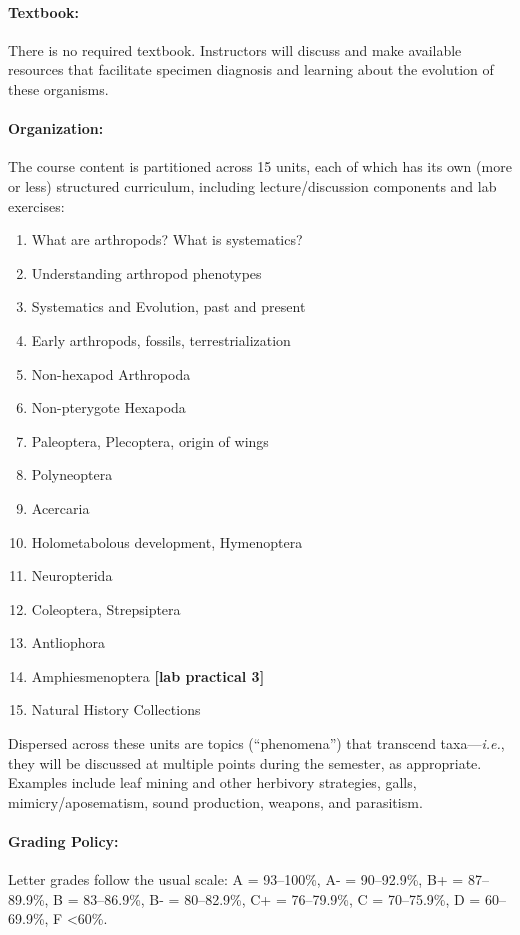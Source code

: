 \documentclass[11pt]{article}
\begin{document}
\paragraph{Textbook:} 
There is no required textbook. Instructors will discuss and make available resources that facilitate specimen diagnosis and learning about the evolution of these organisms.

\paragraph{Organization:}
The course content is partitioned across 15 units, each of which has its own (more or less) structured curriculum, including lecture/discussion components and lab exercises:

\begin{enumerate}
\item What are arthropods? What is systematics?
\item Understanding arthropod phenotypes
\item Systematics and Evolution, past and present
\item Early arthropods, fossils, terrestrialization 
\item Non-hexapod Arthropoda
\item Non-pterygote Hexapoda
\item Paleoptera, Plecoptera, origin of wings
\item Polyneoptera
\item Acercaria
\item Holometabolous development, Hymenoptera 
\item Neuropterida 
\item Coleoptera, Strepsiptera
\item Antliophora
\item Amphiesmenoptera  \textbf{[lab practical 3]}
\item Natural History Collections
\end{enumerate}

\noindent{}Dispersed across these units are topics (``phenomena'') that transcend taxa---\textit{i.e.}, they will be discussed at multiple points during the semester, as appropriate. Examples include leaf mining and other herbivory strategies, galls, mimicry/aposematism, sound production, weapons, and parasitism.

\paragraph{Grading Policy:} Letter grades follow the usual scale: A = 93--100\%, A- = 90--92.9\%, B+ = 87--89.9\%, B = 83--86.9\%, B- = 80--82.9\%, C+ = 76--79.9\%, C = 70--75.9\%, D = 60--69.9\%, F \textless 60\%.
\end{document}
